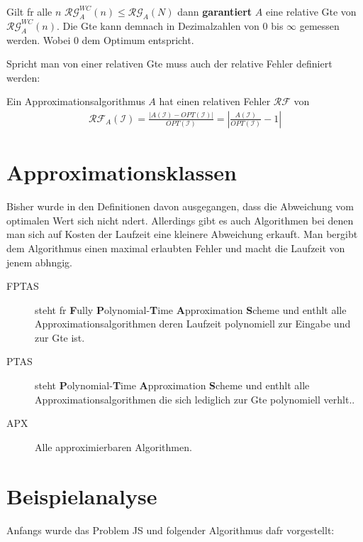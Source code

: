 \documentclass[12pt, a4paper, twoside]{scrartcl}
\begin{document}
Gilt fr alle $n$ $\mathcal{RG}_{A}^{WC}(n) \leq \mathcal{RG}_{A}(N)$ dann \textbf{garantiert} $A$ eine relative Gte von $\mathcal{RG}_{A}^{WC}(n)$. Die Gte kann demnach in Dezimalzahlen von 0 bis $\infty$ gemessen werden. Wobei 0 dem Optimum entspricht.

Spricht man von einer relativen Gte muss auch der relative Fehler definiert werden:

\begin{definition}
	Ein Approximationsalgorithmus $A$ hat einen relativen Fehler $\mathcal{RF}$ von
	\begin{align}
		\mathcal{RF}_{A}(\mathcal I) = \frac{|A(\mathcal I)-OPT(\mathcal I)|}{OPT(\mathcal I)} = \left| \frac{A(\mathcal I)}{OPT(\mathcal I)} - 1 \right|
	\end{align}
\end{definition}

\section{Approximationsklassen} %
Bisher wurde in den Definitionen davon ausgegangen, dass die Abweichung vom optimalen Wert sich nicht ndert. Allerdings gibt es auch Algorithmen bei denen man sich auf Kosten der Laufzeit  eine kleinere Abweichung \glqq erkauft\grqq{}. Man bergibt dem Algorithmus einen maximal erlaubten Fehler und macht die Laufzeit von jenem abhngig.

\begin{description}
	\item[FPTAS] steht fr \textbf{F}ully \textbf{P}olynomial-\textbf{T}ime \textbf{A}pproximation \textbf{S}cheme und enthlt alle Approximationsalgorithmen deren Laufzeit polynomiell zur Eingabe und zur Gte ist.
	\item[PTAS] steht \textbf{P}olynomial-\textbf{T}ime \textbf{A}pproximation \textbf{S}cheme und enthlt alle Approximationsalgorithmen die sich lediglich zur Gte polynomiell verhlt..
	\item[APX] Alle approximierbaren Algorithmen.
\end{description}



\section{Beispielanalyse} 
Anfangs wurde das Problem \ac{JS} und folgender Algorithmus dafr vorgestellt:
 
\end{document}
